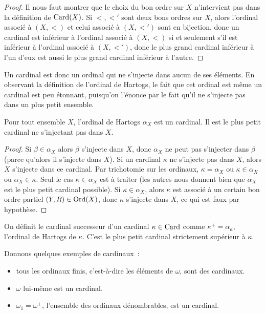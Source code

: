 \begin{proof}
  Il nous faut montrer que le choix du bon ordre sur $X$ n'intervient pas dans
  la définition de $\operatorname{Card}(X)$. Si $<,<'$ sont deux bons ordres sur $X$, alors
  l'ordinal associé à $(X,<)$ et celui associé à $(X,<')$ sont en bijection,
  donc un cardinal est inférieur à l'ordinal associé à $(X,<)$ si et seulement
  s'il est inférieur à l'ordinal associé à $(X,<')$, donc le plus grand
  cardinal inférieur à l'un d'eux est aussi le plus grand cardinal inférieur à
  l'autre.
\end{proof}

Un cardinal est donc un ordinal qui ne s'injecte dans aucun de ses éléments.
En observant la définition de l'ordinal de Hartogs, le fait que cet ordinal est
même un cardinal est peu étonnant, puisqu'on l'énonce par le fait qu'il ne
s'injecte pas dans un plus petit ensemble.

\begin{property}
  Pour tout ensemble $X$, l'ordinal de Hartogs $\alpha_X$ est un cardinal.
  Il est le plus petit cardinal ne s'injectant pas dans $X$.
\end{property}

\begin{proof}
  Si $\beta\in\alpha_X$ alors $\beta$ s'injecte dans $X$, donc $\alpha_X$ ne
  peut pas s'injecter dans $\beta$ (parce qu'alors il s'injecte dans $X$). Si
  un cardinal $\kappa$ ne s'injecte pas dans $X$, alors $X$ s'injecte dans ce
  cardinal. Par trichotomie sur les ordinaux, $\kappa = \alpha_X$ ou
  $\kappa \in \alpha_X$ ou $\alpha_X \in \kappa$. Seul le cas
  $\kappa\in\alpha_X$ est à traiter (les autres nous donnent bien que
  $\alpha_X$ est le plus petit cardinal possible). Si $\kappa\in\alpha_X$,
  alors $\kappa$ est associé à un certain bon ordre partiel $(Y,R)\in\operatorname{Ord}(X)$,
  donc $\kappa$ s'injecte dans $X$, ce qui est faux par hypothèse.
\end{proof}

\begin{definition}
  On définit le cardinal successeur d'un cardinal $\kappa\in\operatorname{Card}$ comme
  $\kappa^+ = \alpha_\kappa$, l'ordinal de Hartogs de $\kappa$. C'est le plus
  petit cardinal strictement supérieur à $\kappa$.
\end{definition}

\begin{example}
  Donnons quelques exemples de cardinaux~:
  \begin{itemize}
  \item tous les ordinaux finis, c'est-à-dire les éléments de $\omega$, sont
    des cardinaux.
  \item $\omega$ lui-même est un cardinal.
  \item $\omega_1 = \omega^+$, l'ensemble des ordinaux dénombrables, est un
    cardinal.
  \end{itemize}
\end{example}

